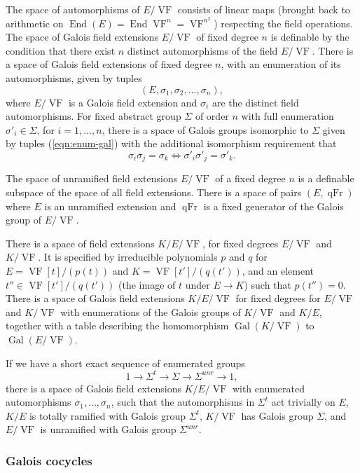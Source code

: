 \documentclass[12pt]{amsart}
\newcommand{\op}[1]{\operatorname{#1}}
\def\VF{{\op{VF}}}
\theoremstyle{plain}
\theoremstyle{definition}
\begin{document}
The space of automorphisms of $E/\VF$ consists of linear maps
(brought back to arithmetic on $\op{End}(E) = \op{End}{\VF^n} =
\VF^{n^2}$) respecting the field operations.  The space of Galois
field extensions $E/\VF$ of fixed degree $n$ is definable by the
condition that there exist $n$ distinct automorphisms of the field
$E/\VF$.  There is a space of Galois
field extensions of fixed degree $n$, with an enumeration of
its automorphisms, given by tuples
\begin{equation}\label{eqn:enum-gal}
(E,\sigma_1,\sigma_2,\ldots,\sigma_n),
\end{equation}
where $E/\VF$ is a Galois field extension and $\sigma_i$ are the
distinct field automorphisms.  For fixed abstract group $\Sigma$ of
order $n$ with full enumeration $\sigma'_i\in \Sigma$, for
$i=1,\ldots,n$, there is a space of Galois groups isomorphic to
$\Sigma$ given by tuples (\ref{eqn:enum-gal}) with the additional
isomorphism requirement that
\[
\sigma_i\sigma_j = \sigma_k \Longleftrightarrow \sigma'_i\sigma'_j =
\sigma'_k.
\]

The space of unramified field extensions $E/\VF$ of a fixed degree $n$
is a definable subspace of the space of all field extensions.  There
is a space of pairs $(E,\op{qFr})$ where $E$ is an unramified extension
and $\op{qFr}$ is a fixed generator of the Galois group of $E/\VF$.  

There is a space of field extensions $K/E/\VF$, for fixed degrees
$E/\VF$ and $K/\VF$.  It is specified by irreducible polynomials
$p$ and $q$ for $E = \VF[t]/(p(t))$ and $K = \VF[t']/(q(t'))$, and an
element $t''\in \VF[t']/(q(t'))$ (the image of $t$ under $E\to K$) such
that $p(t'') = 0$.  There is a space of Galois field extensions
$K/E/\VF$ for fixed degrees for $E/\VF$ and $K/\VF$ with enumerations
of the Galois groups of $K/\VF$ and $K/E$, together with a table
describing the homomorphism $\op{Gal}(K/\VF)$ to $\op{Gal}(E/\VF)$.

If we have a short exact sequence of enumerated groups 
\[
1 \to \Sigma^t \to \Sigma \to \Sigma^{unr}\to 1,
\]
there is a space of Galois field extensions $K/E/\VF$ with enumerated
automorphisms $\sigma_1,\ldots,\sigma_n$, such that the automorphisms in
$\Sigma^t$ act trivially on $E$, $K/E$ is totally ramified with Galois
group $\Sigma^t$, $K/\VF$ has Galois group $\Sigma$, and $E/\VF$ is
unramified with Galois group $\Sigma^{unr}$.

\subsubsection{Galois cocycles}
\end{document}
